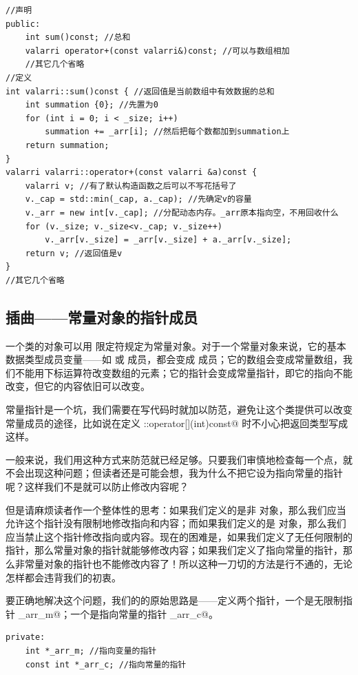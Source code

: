 \begin{lstlisting}
//声明
public:
    int sum()const; //总和
    valarri operator+(const valarri&)const; //可以与数组相加
    //其它几个省略
//定义
int valarri::sum()const { //返回值是当前数组中有效数据的总和
    int summation {0}; //先置为0
    for (int i = 0; i < _size; i++)
        summation += _arr[i]; //然后把每个数都加到summation上
    return summation;
}
valarri valarri::operator+(const valarri &a)const {
    valarri v; //有了默认构造函数之后可以不写花括号了
    v._cap = std::min(_cap, a._cap); //先确定v的容量
    v._arr = new int[v._cap]; //分配动态内存。_arr原本指向空，不用回收什么
    for (v._size; v._size<v._cap; v._size++)
        v._arr[v._size] = _arr[v._size] + a._arr[v._size];
    return v; //返回值是v
}
//其它几个省略
\end{lstlisting}
\subsection*{插曲——常量对象的指针成员}
一个类的对象可以用 \lstinline@const@ 限定符规定为常量对象。对于一个常量对象来说，它的基本数据类型成员变量——如 \lstinline@int@ 或 \lstinline@double@ 成员，都会变成 \lstinline@const@ 成员；它的数组会变成常量数组，我们不能用下标运算符改变数组的元素；它的指针会变成常量指针，即它的指向不能改变，但它的内容依旧可以改变。\par
常量指针是一个坑，我们需要在写代码时就加以防范，避免让这个类提供可以改变常量成员的途径，比如说在定义 \lstinline@valarri::operator[](int)const@ 时不小心把返回类型写成 \lstinline@int@ 这样。\par
一般来说，我们用这种方式来防范就已经足够。只要我们审慎地检查每一个点，就不会出现这种问题；但读者还是可能会想，我为什么不把它设为指向常量的指针呢？这样我们不是就可以防止修改内容呢？\par
但是请麻烦读者作一个整体性的思考：如果我们定义的是非 \lstinline@const@ 对象，那么我们应当允许这个指针没有限制地修改指向和内容；而如果我们定义的是 \lstinline@const@ 对象，那么我们应当禁止这个指针修改指向或内容。现在的困难是，如果我们定义了无任何限制的指针，那么常量对象的指针就能够修改内容；如果我们定义了指向常量的指针，那么非常量对象的指针也不能修改内容了！所以这种一刀切的方法是行不通的，无论怎样都会违背我们的初衷。\par
要正确地解决这个问题，我们的的原始思路是——定义两个指针，一个是无限制指针 \lstinline@_arr_m@；一个是指向常量的指针 \lstinline@_arr_c@。
\begin{lstlisting}
private:
    int *_arr_m; //指向变量的指针
    const int *_arr_c; //指向常量的指针
\end{lstlisting}
